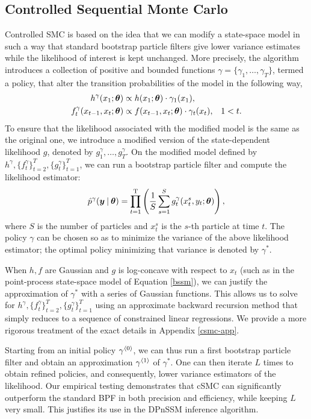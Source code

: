 \documentclass[twoside]{article}
\begin{document}
\subsection{Controlled Sequential Monte Carlo} \label{ssec:csmc}
Controlled SMC is based on the idea that we can modify a state-space model in such a way that standard bootstrap particle filters give lower variance estimates while the likelihood of interest is kept unchanged. More precisely, the algorithm introduces a collection of positive and bounded functions $\gamma = \{\gamma_1, \ldots, \gamma_T\}$, termed a policy, that alter the transition probabilities of the model in the following way,
\begin{align}
h^\gamma(x_1; \boldsymbol{\theta}) &\propto h(x_1; \boldsymbol{\theta}) \cdot \gamma_1(x_1), \\
f^\gamma_t(x_{t-1}, x_{t}; \boldsymbol{\theta}) &\propto f(x_{t-1}, x_t; \boldsymbol{\theta}) \cdot \gamma_t(x_t), & 1 < t. \nonumber
\end{align}
To ensure that the likelihood associated with the modified model is the same as the original one, we introduce a modified version of the state-dependent likelihood $g$, denoted by $g_{1}^{\gamma},\ldots,g_{T}^{\gamma}$. On the modified model defined by $h^{\gamma}, \{f_{t}^{\gamma}\}_{t=2}^T,\{g_{t}^{\gamma}\}_{t=1}^T$, we can run a bootstrap particle filter and compute the likelihood estimator:
\begin{align}
\hat{p}^{\gamma}(\boldsymbol{y} \:\vert\: \boldsymbol{\theta}) = \prod_{t=1}^\text{T} \left(\frac{1}{S} \sum_{s=1}^S g_t^\gamma(x_t^s, y_t; \boldsymbol{\theta})\right),
\end{align}
where $S$ is the number of particles and $x_t^s$ is the $s$-th particle at time $t$.  The policy $\gamma$ can be chosen so as to minimize the variance of the above likelihood estimator; the optimal policy minimizing that variance is denoted by $\gamma^{*}$.

When $h, f$ are Gaussian and $g$ is log-concave with respect to $x_t$ (such as in the point-process state-space model of Equation \ref{bssm}), we can justify the approximation of $\gamma^*$ with a series of Gaussian functions. This allows us to solve for $h^{\gamma}, \{f_{t}^{\gamma}\}_{t=2}^T,\{g_{t}^{\gamma}\}_{t=1}^T$ using an approximate backward recursion method that simply reduces to a sequence of constrained linear regressions. We provide a more rigorous treatment of the exact details in Appendix \ref{csmc-app}.  

Starting from an initial policy {$\gamma^{\langle0\rangle}_{}$}, we can thus run a first bootstrap particle filter and obtain an approximation {$\gamma^{\langle1\rangle}_{}$} of $\gamma^{*}$. One can then iterate $L$ times to obtain refined policies, and consequently, lower variance estimators of the likelihood. Our empirical testing demonstrates that cSMC can significantly outperform the standard BPF in both precision and efficiency, while keeping $L$ very small. This justifies its use in the DPnSSM inference algorithm.
\end{document}
